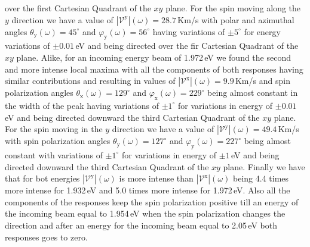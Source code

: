 \documentclass[prb,11pt,tightenlines,twocolumn,aps]{revtex4-1}
\begin{document}
over the first Cartesian Quadrant of the $xy$ plane.
% 
For the spin moving along the $y$ direction we have a value of
$|\mathcal{V}^{\mathrm{y}}|(\omega)=28.7$\,Km/s with polar and azimuthal angles
$\theta_{\mathrm{y}}(\omega)=45^{\circ}$ and
$\varphi_{\mathrm{y}}(\omega)=56^{\circ}$ having variations of $\pm5^{\circ}$
for energy variations of $\pm0.01$\,eV and being directed over the fir Cartesian
Quadrant of the $xy$ plane.
% 
Alike, for an incoming energy beam of 1.972\,eV we found the second and more
intense local maxima with all the components of both responses having similar
contributions and resulting in values of
$|\mathcal{V}^{\mathrm{x}}|(\omega)=9.9$\,Km/s and spin polarization angles
$\theta_{\mathrm{x}}(\omega)=129^{\circ}$ and
$\varphi_{\mathrm{x}}(\omega)=229^{\circ}$ being almost constant in the width of
the peak having variations of $\pm1^{\circ}$ for variations in energy of
$\pm0.01$\,eV and being directed downward the third Cartesian Quadrant of the
$xy$ plane.
% 
For the spin moving in the $y$ direction we have a value of
$|\mathcal{V}^{\mathrm{y}}|(\omega)=49.4$\,Km/s with spin polarization angles
$\theta_{\mathrm{y}}(\omega)=127^{\circ}$ and
$\varphi_{\mathrm{y}}(\omega)=227^{\circ}$ being almost constant with variations
of $\pm1^{\circ}$ for variations in energy of $\pm1$\,eV and being directed
downward the third Cartesian Quadrant of the $xy$ plane.
% 
Finally we have that for bot energies $|\mathcal{V}^{\mathrm{y}}|(\omega)$ is
more intense than $|\mathcal{V}^{\mathrm{x}}|(\omega)$ being 4.4 times more
intense for 1.932\,eV and 5.0 times more intense for 1.972\,eV. Also all the
components of the responses keep the spin polarization positive till an energy
of the incoming beam equal to 1.954\,eV when the spin polarization changes the
direction and after an energy for the incoming beam equal to 2.05\,eV both
responses goes to zero.

\end{document}
